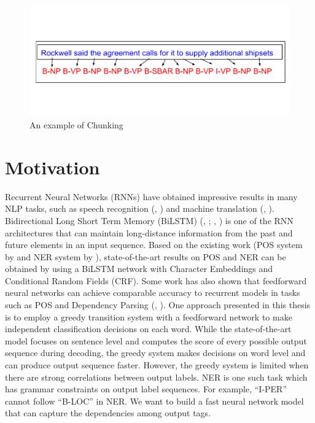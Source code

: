 \vspace{-1cm}
\begin{figure}[h]
  \centering
  \includegraphics[scale=0.8]{Chunkingex.pdf}
 \caption{An example of Chunking}
  \label{fig:chunk-ex}
\end{figure}

\section{Motivation}
Recurrent Neural Networks (RNNs) have obtained impressive results in many NLP tasks, such as speech recognition (\citeauthor{graves2013speech}, \citeyear{graves2013speech}) and machine translation (\citeauthor{cho2014properties}, \citeyear{cho2014properties}).
Bidirectional Long Short Term Memory (BiLSTM) (\citeauthor{Hochreiter97longshort-term}, \citeyear{Hochreiter97longshort-term}; \citeauthor{graves2005framewise}, \citeyear{graves2005framewise}) is one of the RNN architectures that can maintain long-distance information from the past and future elements in an input sequence. Based on the existing work (POS system by \cite{ling2015finding} and NER system by \cite{lample2016neural}), state-of-the-art results on POS and NER can be obtained by using a BiLSTM network with Character Embeddings and Conditional Random Fields (CRF). Some work has also shown that feedforward neural networks can achieve comparable accuracy to recurrent models in tasks such as POS and Dependency Parsing (\citeauthor{andor2016globally}, \citeyear{andor2016globally}). One approach presented in this thesis is to employ a greedy transition system with a feedforward network to make independent classification decisions on each word. While the state-of-the-art model focuses on sentence level and computes the score of every possible output sequence during decoding, the greedy system makes decisions on word level and can produce output sequence faster. However, the greedy system is limited when there are strong correlations between output labels. NER is one such task which has grammar constraints on output label sequences. For example, ``I-PER'' cannot follow ``B-LOC'' in NER. We want to build a fast neural network model that can capture the dependencies among output tags.

